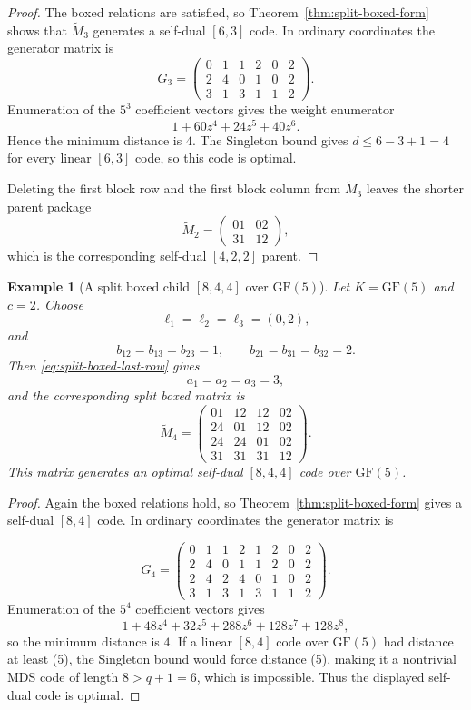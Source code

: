 \documentclass[12pt]{article}
\newtheorem{example}[theorem]{Example}
\newcommand{\GF}[1]{\ensuremath{\mathrm{GF}(#1)}}
\begin{document}
\begin{proof}
The boxed relations are satisfied, so Theorem~\ref{thm:split-boxed-form} shows that \(\widetilde M_3\) generates a self-dual \([6,3]\) code. In ordinary coordinates the generator matrix is
\[
G_3=
\left(
\begin{array}{cc|cc|cc}
0&1&1&2&0&2\\
\hline
2&4&0&1&0&2\\
\hline
3&1&3&1&1&2
\end{array}
\right).
\]
Enumeration of the \(5^3\) coefficient vectors gives the weight enumerator
\[
1+60z^4+24z^5+40z^6.
\]
Hence the minimum distance is \(4\).  The Singleton bound gives
\(d\le6-3+1=4\) for every linear \([6,3]\) code, so this code is optimal.

Deleting the first block row and the first block column from \(\widetilde M_3\) leaves the shorter parent package
\[
\widetilde M_2=
\begin{pmatrix}
01 & 02\\
31 & 12
\end{pmatrix},
\]
which is the corresponding self-dual \([4,2,2]\) parent.
\end{proof}

\begin{example}[A split boxed child \texorpdfstring{$[8,4,4]$}{[8,4,4]} over \texorpdfstring{$\GF{5}$}{GF(5)}]
\label{ex:split-boxed-84}
\rm
Let \(K=\GF{5}\) and \(c=2\). Choose
\[
\ell_1=\ell_2=\ell_3=(0,2),
\]
and
\[
b_{12}=b_{13}=b_{23}=1,\qquad
b_{21}=b_{31}=b_{32}=2.
\]
Then \eqref{eq:split-boxed-last-row} gives
\[
a_1=a_2=a_3=3,
\]
and the corresponding split boxed matrix is
\[
\widetilde M_4=
\begin{pmatrix}
01 & 12 & 12 & 02\\
24 & 01 & 12 & 02\\
24 & 24 & 01 & 02\\
31 & 31 & 31 & 12
\end{pmatrix}.
\]
This matrix generates an optimal self-dual \([8,4,4]\) code over \(\GF{5}\).
\end{example}

\begin{proof}
Again the boxed relations hold, so Theorem~\ref{thm:split-boxed-form} gives a self-dual \([8,4]\) code. In ordinary coordinates the generator matrix is

\[
G_4= \left(
\begin{array}{cc|cccc|cc}
0&1&1&2&1&2&0&2\\
2&4&0&1&1&2&0&2\\
2&4&2&4&0&1&0&2\\
\hline
3&1&3&1&3&1&1&2
\end{array}
\right).
\]
Enumeration of the \(5^4\) coefficient vectors gives
\[
1+48z^4+32z^5+288z^6+128z^7+128z^8,
\]
so the minimum distance is \(4\).  If a linear \([8,4]\) code over
\(\GF{5}\) had distance at least (5), the Singleton bound would force
distance (5), making it a nontrivial MDS code of length \(8>q+1=6\),
which is impossible.  Thus the displayed self-dual code is optimal.
\end{proof}
\end{document}
